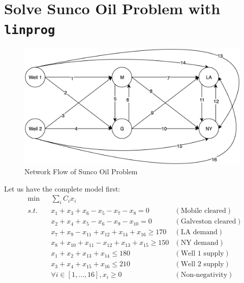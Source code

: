  



\section{Solve Sunco Oil Problem with \texttt{linprog}}

\begin{figure}[h]
    \centering
    \includegraphics[width=0.9\linewidth]{hw1/hw1-prob2-graph.png}
    \caption{Network Flow of Sunco Oil Problem}
\end{figure}

Let us have the complete model first:
\begin{align*}
&\min && \sum_i C_ix_i \\
&s.t.
 && x_1 + x_3 + x_6 - x_5 - x_7 - x_8 = 0&(\text{Mobile cleared})\\
&&&x_2 + x_4 + x_5 - x_6 - x_9 - x_{10} =  0&(\text{Galveston cleared}) \\
&&& x_7 + x_9 - x_{11} + x_{12} + x_{14} + x_{16} \geq 170 &(\text{LA demand})\\
&&& x_8 + x_{10} + x_{11} - x_{12} + x_{13} + x_{15} \geq 150 &(\text{NY demand}) \\
&&&x_1 + x_2 + x_{13} + x_{14} \leq 180 &(\text{Well 1 supply})\\
&&& x_3 + x_4 + x_{15} + x_{16} \leq 210 &(\text{Well 2 supply}) \\
&&& \forall i \in [1,...,16], x_i \geq 0 & (\text{Non-negativity})
\end{align*}

